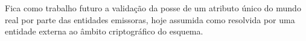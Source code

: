 Fica como trabalho futuro a validação da posse de um atributo único do mundo real por parte das entidades emissoras, hoje assumida como resolvida por uma entidade externa ao âmbito criptográfico do esquema.

